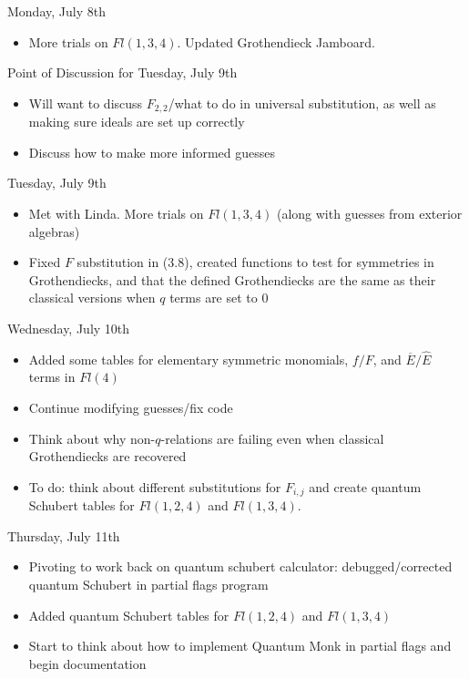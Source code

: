 Monday, July 8th
\begin{itemize}
    \item More trials on $Fl(1, 3, 4)$. Updated Grothendieck Jamboard.
\end{itemize}

Point of Discussion for Tuesday, July 9th
\begin{itemize}
    \item Will want to discuss $F_{2, 2}$/what to do in universal substitution, as well as making sure ideals are set up correctly
    \item Discuss how to make more informed guesses
\end{itemize}

Tuesday, July 9th
\begin{itemize}
    \item Met with Linda. More trials on $Fl(1, 3, 4)$ (along with guesses from exterior algebras)
    \item Fixed $F$ substitution in (3.8), created functions to test for symmetries in Grothendiecks, and that the defined Grothendiecks are the same as their classical versions when $q$ terms are set to $0$
\end{itemize}

Wednesday, July 10th
\begin{itemize}
    \item Added some tables for elementary symmetric monomials, $f/F$, and $\overline{E}/\hat{E}$ terms in $Fl(4)$
    \item Continue modifying guesses/fix code
    \item Think about why non-$q$-relations are failing even when classical Grothendiecks are recovered
    \item To do: think about different substitutions for $F_{i, j}$ and create quantum Schubert tables for $Fl(1, 2, 4)$ and $Fl(1, 3, 4)$.
\end{itemize}

Thursday, July 11th
\begin{itemize}
    \item Pivoting to work back on quantum schubert calculator: debugged/corrected quantum Schubert in partial flags program
    \item Added quantum Schubert tables for $Fl(1, 2, 4)$ and $Fl(1, 3, 4)$
    \item Start to think about how to implement Quantum Monk in partial flags and begin documentation
\end{itemize}